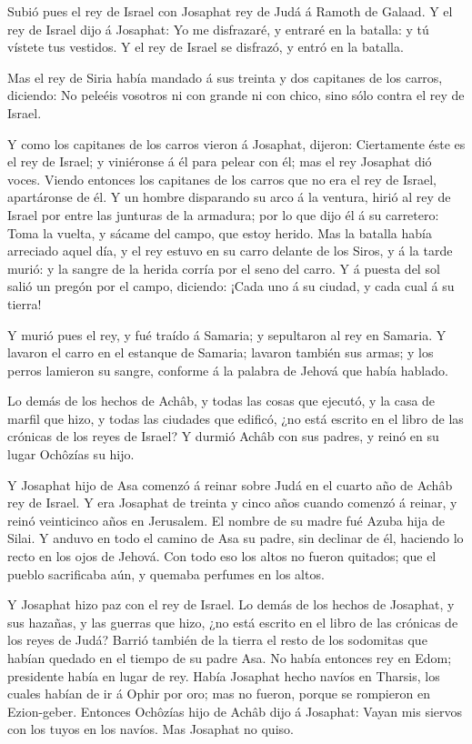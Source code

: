  Subió pues el rey de Israel con Josaphat rey de Judá á
Ramoth de Galaad.  Y el rey de Israel dijo á Josaphat: Yo
me disfrazaré, y entraré en la batalla: y tú vístete tus vestidos. Y el
rey de Israel se disfrazó, y entró en la batalla.

 Mas el rey de Siria había mandado á sus treinta y dos
capitanes de los carros, diciendo: No peleéis vosotros ni con grande ni
con chico, sino sólo contra el rey de Israel.

 Y como los capitanes de los carros vieron á Josaphat,
dijeron: Ciertamente éste es el rey de Israel; y viniéronse á él para
pelear con él; mas el rey Josaphat dió voces.  Viendo
entonces los capitanes de los carros que no era el rey de Israel,
apartáronse de él.  Y un hombre disparando su arco á la
ventura, hirió al rey de Israel por entre las junturas de la armadura;
por lo que dijo él á su carretero: Toma la vuelta, y sácame del campo,
que estoy herido.  Mas la batalla había arreciado aquel
día, y el rey estuvo en su carro delante de los Siros, y á la tarde
murió: y la sangre de la herida corría por el seno del carro.
 Y á puesta del sol salió un pregón por el campo, diciendo:
¡Cada uno á su ciudad, y cada cual á su tierra!

 Y murió pues el rey, y fué traído á Samaria; y sepultaron
al rey en Samaria.  Y lavaron el carro en el estanque de
Samaria; lavaron también sus armas; y los perros lamieron su sangre,
conforme á la palabra de Jehová que había hablado.

 Lo demás de los hechos de Achâb, y todas las cosas que
ejecutó, y la casa de marfil que hizo, y todas las ciudades que edificó,
¿no está escrito en el libro de las crónicas de los reyes de Israel?
 Y durmió Achâb con sus padres, y reinó en su lugar
Ochôzías su hijo.

 Y Josaphat hijo de Asa comenzó á reinar sobre Judá en el
cuarto año de Achâb rey de Israel.  Y era Josaphat de
treinta y cinco años cuando comenzó á reinar, y reinó veinticinco años
en Jerusalem. El nombre de su madre fué Azuba hija de Silai.
 Y anduvo en todo el camino de Asa su padre, sin declinar
de él, haciendo lo recto en los ojos de Jehová.  Con todo
eso los altos no fueron quitados; que el pueblo sacrificaba aún, y
quemaba perfumes en los altos.

 Y Josaphat hizo paz con el rey de Israel.  Lo
demás de los hechos de Josaphat, y sus hazañas, y las guerras que hizo,
¿no está escrito en el libro de las crónicas de los reyes de Judá?
 Barrió también de la tierra el resto de los sodomitas que
habían quedado en el tiempo de su padre Asa.  No había
entonces rey en Edom; presidente había en lugar de rey. 
Había Josaphat hecho navíos en Tharsis, los cuales habían de ir á Ophir
por oro; mas no fueron, porque se rompieron en Ezion-geber.
 Entonces Ochôzías hijo de Achâb dijo á Josaphat: Vayan mis
siervos con los tuyos en los navíos. Mas Josaphat no quiso.

